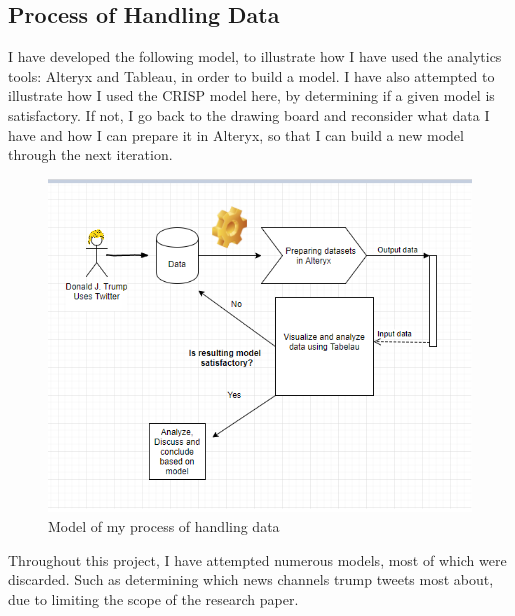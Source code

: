 \documentclass[12pt]{article}
\begin{document}
\subsection{Process of Handling Data}

I have developed the following model, to illustrate how I have used the analytics tools:  Alteryx and Tableau, in order to build a model. I have also attempted to illustrate how I used the CRISP model here, by determining if a given model is satisfactory. If not, I go back to the drawing board and reconsider what data I have and how I can prepare it in Alteryx, so that I can build a new model through the next iteration.



\begin{figure}[H] %
	\centering %
\includegraphics [scale= .85]  {SygModel.PNG}    %
	\caption[Optional caption] {Model of my process of handling data}
	\label{fig:wordcloudBliz}

\end{figure}


Throughout this project, I have attempted numerous models, most of which were discarded. Such as determining which news channels trump tweets most about, due to limiting the scope of the research paper.
\end{document}
